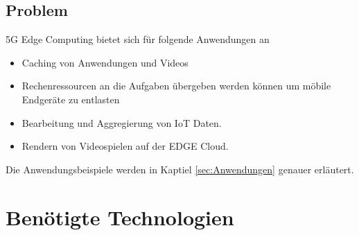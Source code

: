 \documentclass[runningheads]{llncs}
\numberwithin{figure}{section}
\begin{document}
\subsection{Problem}
\label{subsec:Problem}
5G Edge Computing bietet sich für folgende Anwendungen an
\begin{itemize}
  \item Caching von Anwendungen und Videos
  \item Rechenressourcen an die Aufgaben übergeben werden können um möbile Endgeräte zu entlasten
  \item Bearbeitung und Aggregierung von IoT Daten.
  \item Rendern von Videospielen auf der EDGE Cloud.
\end{itemize}
Die Anwendungsbeispiele werden in Kaptiel \ref{sec:Anwendungen} genauer erläutert.
\section{Benötigte Technologien}
\label{sec:Benötigte Technologien}
\end{document}
